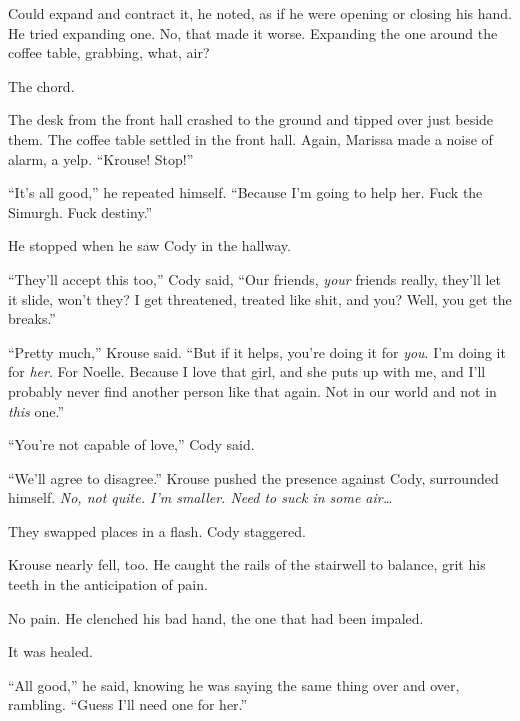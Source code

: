 Could expand and contract it, he noted, as if he were opening or closing his hand.  He tried expanding one.  No, that made it worse.  Expanding the one around the coffee table, grabbing, what, air?



The chord.



The desk from the front hall crashed to the ground and tipped over just beside them.  The coffee table settled in the front hall.  Again, Marissa made a noise of alarm, a yelp.  ``Krouse!  Stop!''



``It's all good,'' he repeated himself.  ``Because I'm going to help her.  Fuck the Simurgh.  Fuck destiny.''



He stopped when he saw Cody in the hallway.



``They'll accept this too,'' Cody said, ``Our friends, \emph{your} friends really, they'll let it slide, won't they?  I get threatened, treated like shit, and you?  Well, you get the breaks.''



``Pretty much,'' Krouse said.  ``But if it helps, you're doing it for \emph{you}.  I'm doing it for \emph{her}.  For Noelle.  Because I love that girl, and she puts up with me, and I'll probably never find another person like that again.  Not in our world and not in \emph{this} one.''



``You're not capable of love,'' Cody said.



``We'll agree to disagree.''  Krouse pushed the presence against Cody, surrounded himself.  \emph{No, not quite.  I'm smaller.  Need to suck in some air\ldots}



They swapped places in a flash.  Cody staggered.



Krouse nearly fell, too.  He caught the rails of the stairwell to balance, grit his teeth in the anticipation of pain.



No pain.  He clenched his bad hand, the one that had been impaled.



It was healed.



``All good,'' he said, knowing he was saying the same thing over and over, rambling.  ``Guess I'll need one for her.''



